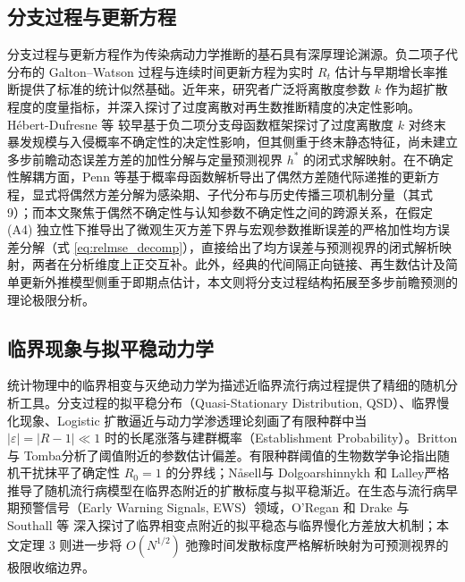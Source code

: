 \documentclass[11pt,a4paper]{article}
\theoremstyle{plain}
\theoremstyle{definition}
\begin{document}
\subsection{分支过程与更新方程}
分支过程与更新方程作为传染病动力学推断的基石具有深厚理论渊源。负二项子代分布的 Galton--Watson 过程\citep{harris1963branching, athreya1972branching, jagers1975branching}与连续时间更新方程\citep{wallinga2004different, wallinga2007generation, cori2013framework}为实时 $R_t$ 估计\citep{abbott2020epinow2, gostic2020practical}与早期增长率推断\citep{bettencourt2008real}提供了标准的统计似然基础。近年来，研究者广泛将离散度参数 $k$ 作为超扩散程度的度量指标\citep{lloyd-smith2005superspreading, endo2020overdispersion}，并深入探讨了过度离散对再生数推断精度的决定性影响\citep{ho2023simultaneous, nemcova2026unjustified}。Hébert-Dufresne 等\citep{hebert-dufresne2020beyond} 较早基于负二项分支母函数框架探讨了过度离散度 $k$ 对终末暴发规模与入侵概率不确定性的决定性影响，但其侧重于终末静态特征，尚未建立多步前瞻动态误差方差的加性分解与定量预测视界 $h^*$ 的闭式求解映射。在不确定性解耦方面，Penn 等\citep{penn2023intrinsic}基于概率母函数解析导出了偶然方差随代际递推的更新方程，显式将偶然方差分解为感染期、子代分布与历史传播三项机制分量（其式 9）；而本文聚焦于偶然不确定性与认知参数不确定性之间的跨源关系，在假定 (A4) 独立性下推导出了微观生灭方差下界与宏观参数推断误差的严格加性均方误差分解（式 \ref{eq:relmse_decomp}），直接给出了均方误差与预测视界的闭式解析映射，两者在分析维度上正交互补。此外，经典的代间隔正向链接\citep{park2021forward}、再生数估计\citep{fraser2007estimating}及简单更新外推模型\citep{nouvellet2018simple}侧重于即期点估计，本文则将分支过程结构拓展至多步前瞻预测的理论极限分析。

\subsection{临界现象与拟平稳动力学}
统计物理中的临界相变与灭绝动力学为描述近临界流行病过程提供了精细的随机分析工具。分支过程的拟平稳分布（Quasi-Stationary Distribution, QSD）\citep{darroch1965quasi}、临界慢化现象\citep{kessler2007extinction}、Logistic 扩散逼近\citep{ethier1986markov}与动力学渗透理论\citep{grassberger1983critical}刻画了有限种群中当 $|\varepsilon|=|R-1| \ll 1$ 时的长尾涨落与建群概率（Establishment Probability）。Britton 与 Tomba\citep{britton2019estimation}分析了阈值附近的参数估计偏差。有限种群阈值的生物数学争论\citep{lloydsmith2005should}指出随机干扰抹平了确定性 $R_0 = 1$ 的分界线；N{\aa}sell\citep{nasell1999quasi}与 Dolgoarshinnykh 和 Lalley\citep{dolgoarshinnykh2006critical}严格推导了随机流行病模型在临界态附近的扩散标度与拟平稳渐近。在生态与流行病早期预警信号（Early Warning Signals, EWS）领域，O'Regan 和 Drake\citep{oregan2013theory} 与 Southall 等\citep{southall2021early} 深入探讨了临界相变点附近的拟平稳态与临界慢化方差放大机制；本文定理 3 则进一步将 $O(N^{1/2})$ 弛豫时间发散标度严格解析映射为可预测视界的极限收缩边界。
\end{document}
